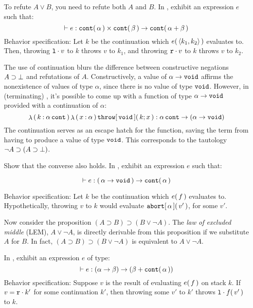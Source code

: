 \documentclass[11pt]{article}
\begin{document}
\begin{task}{10}
To refute $A \lor B$, you need to refute both $A$ and $B$. In , exhibit an expression $e$ such that:
\[
  \vdash {e}\mathrel{:}{
    {{{\mathtt{cont}}\mathtt{(}\,\alpha\,\mathtt{)}}\times{{\ensuremath{\mathtt{cont}}}\ensuremath{\mathtt{(}}\,\beta\,\ensuremath{\mathtt{)}}}}\mathrel{\to}{{\mathtt{cont}}\mathtt{(}\,{\alpha}\mathbin{+}{\beta}\,\mathtt{)}}
  }
\]
\textsf{Behavior specification:} Let $k$ be the continuation which ${e}\mathtt{(}\,\langle k_1, k_2\rangle\,\mathtt{)}$ evaluates to. Then, throwing ${\mathtt{l}}\mathbin{\cdot}{v}$ to $k$ throws $v$ to $k_1$, and throwing ${\mathtt{r}}\mathbin{\cdot}{v}$ to $k$ throws $v$ to $k_2$.
\end{task}


The use of continuation blurs the difference between constructive negations $A \supset \bot$ and refutations of $A$.
Constructively, a value of ${\alpha}\mathrel{\to}{\mathtt{void}}$ affirms the nonexistence of values of type $\alpha$, since there is no value of type $\mathtt{void}$.
However, in (terminating) \LangKPCFv{}, it's possible to come up with a function of type ${\alpha}\mathrel{\to}{\mathtt{void}}$ provided with a continuation of $\alpha$:
\[
  {\mathop{\lambda}\mathtt{(}\,{k}\mathbin{:}{{\alpha}\,\mathtt{cont}}\,\mathtt{)}\,{\mathop{\lambda}\mathtt{(}\,{x}\mathbin{:}{\alpha}\,\mathtt{)}\,{{\mathtt{throw}}\mathtt{[}\,{\mathtt{void}}\,\mathtt{]}\mathtt{(}\,k;x\,\mathtt{)}}}}\mathrel{:}{{{\alpha}\,\mathtt{cont}}\mathrel{\to}{({\alpha}\mathrel{\to}{\mathtt{void}})}}
\]
The continuation serves as an escape hatch for the function, saving the term from having to produce a value of type $\mathtt{void}$. This corresponds to the tautology $\lnot A \supset (A \supset \bot)$.


\begin{task}{10} Show that the converse also holds. In , exhibit an expression $e$ such that:

\[
  \vdash {e}\mathrel{:}{
    {\mathtt{(}\,{\alpha}\mathrel{\to}{\mathtt{void}}\,\mathtt{)}}\mathrel{\to}{{\mathtt{cont}}\mathtt{(}\,\alpha\,\mathtt{)}}
  }
\]

\textsf{Behavior specification:} Let $k$ be the continuation which ${e}\mathtt{(}\,f\,\mathtt{)}$ evaluates to. Hypothetically, throwing $v$ to $k$ would evaluate ${\mathtt{abort}}\mathtt{[}\,{\alpha}\,\mathtt{]}\mathtt{(}\,v'\,\mathtt{)}$, for some $v'$.
\end{task}


\begin{task}{10}
  Now consider the proposition $(A \supset B) \supset (B \lor \lnot A)$.
  The \emph{law of excluded middle} (LEM), $A \lor \lnot A$, is
  directly derivable from this proposition if we substitute $A$ for $B$.
  In fact, $(A \supset B) \supset (B \lor \lnot A)$ is equivalent to $A \lor \lnot A$.

  In , exhibit an expression $e$ of type:
  $$\vdash {e}\mathrel{:}{{({\alpha}\mathrel{\to}{\beta})}\mathrel{\to}{(\beta + {\mathtt{cont}}\mathtt{(}\,\alpha\,\mathtt{)})}}$$
  \textsf{Behavior specification:}
  Suppose $v$ is the result of evaluating ${e}\mathtt{(}\,f\,\mathtt{)}$ on stack $k$.
  If $v = {\mathtt{r}}\mathbin{\cdot}{k'}$ for some continuation $k'$,
  then throwing some $v'$ to $k'$ throws ${\mathtt{l}}\mathbin{\cdot}{{f}\mathtt{(}\,v'\,\mathtt{)}}$ to $k$.
\end{task}
\end{document}
